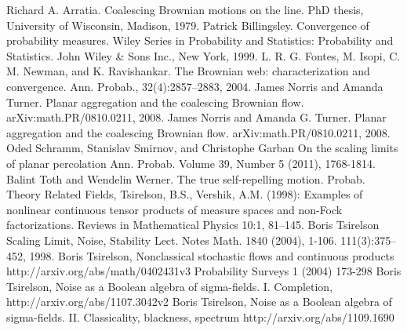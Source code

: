 \begin{thebibliography}{99}
 Richard A. Arratia. Coalescing Brownian motions on
  the line. PhD thesis, University of Wisconsin, Madison, 1979.
 Patrick Billingsley. Convergence of probability
  measures. Wiley Series in Probability and Statistics: Probability
  and Statistics. John Wiley \& Sons Inc., New York, 1999.
 L. R. G. Fontes, M. Isopi, C. M. Newman, and
  K. Ravishankar. The Brownian web: characterization and
  convergence. Ann. Probab., 32(4):2857--2883, 2004.
 James Norris and Amanda
  Turner. Planar aggregation and the coalescing Brownian flow.
  arXiv:math.PR/0810.0211, 2008.
 James Norris and Amanda
  G. Turner. Planar aggregation and the coalescing Brownian
  flow. arXiv:math.PR/0810.0211, 2008.
  Oded Schramm, Stanislav Smirnov, and Christophe Garban
  On the scaling limits of planar percolation
  Ann. Probab. Volume 39, Number 5 (2011), 1768-1814.
 Balint Toth and Wendelin Werner. The true
  self-repelling motion. Probab. Theory Related Fields,
  Tsirelson, B.S., Vershik, A.M. (1998): Examples of nonlinear continuous
  tensor products of measure spaces and non-Fock factorizations. Reviews
  in Mathematical Physics 10:1, 81--145.
  Boris Tsirelson
  Scaling Limit, Noise, Stability
  Lect. Notes Math. 1840 (2004), 1-106.
  111(3):375--452, 1998.
 Boris Tsirelson,
  Nonclassical stochastic flows and continuous products
  http://arxiv.org/abs/math/0402431v3
  Probability Surveys 1 (2004) 173-298
 Boris Tsirelson, Noise as a Boolean
  algebra of sigma-fields. I. Completion, http://arxiv.org/abs/1107.3042v2
 Boris Tsirelson,
  Noise as a Boolean algebra of sigma-fields. II. Classicality,
  blackness, spectrum
  http://arxiv.org/abs/1109.1690
\end{thebibliography}
